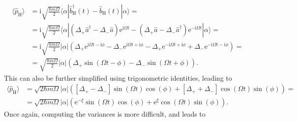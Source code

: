 \documentclass[english, parskip=full]{scrartcl}
\newcommand{\bra}{}
\newcommand{\braket}{}
\newcommand{\kla}{}
\newcommand{\klam}{}
\newcommand{\tecxt}{}
\renewcommand{\i}{\text{i}}
\newcommand{\e}{\text{e}}
\begin{document}
\begin{align}
\bra\langle \hat{p}_\tecxt\text{H} \rangle &= \i\sqrt{\frac{\hbar m\Omega}{2}}\braket\langle \alpha | \hat{b}_\tecxt\text{H}^\dagger(t) - \hat{b}_\tecxt\text{H}(t) | \alpha \rangle =\\
&= \i\sqrt{\frac{\hbar m\Omega}{2}}\braket\langle \alpha | \kla\left( \Delta_+\hat{a}^\dagger - \Delta_-\hat{a} \right)\e^{\i\Omega t} - \kla\left( \Delta_+\hat{a} - \Delta_-\hat{a}^\dagger \right)\e^{-\i\Omega t} | \alpha \rangle = \\
&= \i\sqrt{\frac{\hbar m\Omega}{2}}|\alpha|\kla\left( \Delta_+\e^{\i\Omega t - \i\phi} - \Delta_-\e^{\i\Omega t + \i\phi} - \Delta_+ \e^{-\i\Omega t + \i\phi} + \Delta_-\e^{-\i\Omega t - \i\phi} \right) = \\
&= \sqrt{\frac{\hbar m\Omega}{2}}|\alpha|\kla\left( \Delta_+\sin\kla\left( \Omega t-\phi \right) - \Delta_-\sin\kla\left( \Omega t + \phi \right) \right).
\end{align}
This can also be further simplified using trigonometric identities, leading to
\begin{align}
\bra\langle \hat{p}_\tecxt\text{H} \rangle &= \sqrt{2\hbar m\Omega}|\alpha| \kla\left( \klam\left[ \Delta_+ - \Delta_- \right]\sin (\Omega t)\cos(\phi) + \klam\left[ \Delta_+ + \Delta_- \right]\cos (\Omega t)\sin(\phi) \right) = \\
&=\sqrt{2\hbar m\Omega}|\alpha| \kla\left(  \e^{-\xi}\sin (\Omega t)\cos(\phi) + \e^{\xi}\cos (\Omega t)\sin(\phi)  \right).
\end{align}
Once again, computing the variances is more difficult, and leads to
\end{document}
